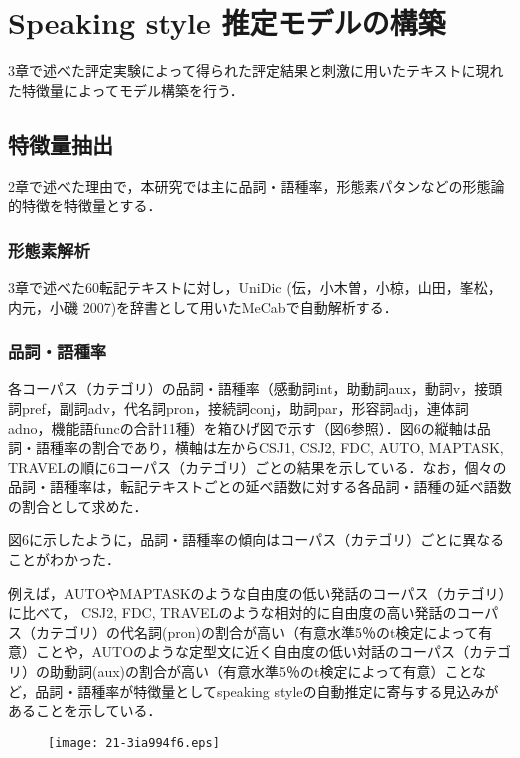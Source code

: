 \documentclass[japanese]{jnlp_1.4}
\begin{document}
\section{Speaking style 推定モデルの構築}

3章で述べた評定実験によって得られた評定結果と刺激に用いたテキストに現れた特徴量によってモデル構築を行う．

\subsection{特徴量抽出}

2章で述べた理由で，本研究では主に品詞・語種率，形態素パタンなどの形態論的特徴を特徴量とする．

\subsubsection{形態素解析}

3章で述べた60転記テキストに対し，UniDic (伝，小木曽，小椋，山田，峯松，内元，小磯 2007)を辞書として用いたMeCabで自動解析する．

\subsubsection{品詞・語種率}

各コーパス（カテゴリ）の品詞・語種率（感動詞int，助動詞aux，動詞v，接頭詞pref，副詞adv，代名詞pron，接続詞conj，助詞par，形容詞adj，連体詞adno，機能語funcの合計11種）を箱ひげ図で示す（図6参照）．図6の縦軸は品詞・語種率の割合であり，横軸は左からCSJ1, CSJ2, FDC, AUTO, MAPTASK, TRAVELの順に6コーパス（カテゴリ）ごとの結果を示している．なお，個々の品詞・語種率は，転記テキストごとの延べ語数に対する各品詞・語種の延べ語数の割合として求めた．

図6に示したように，品詞・語種率の傾向はコーパス（カテゴリ）ごとに異なることがわかった．

例えば，AUTOやMAPTASKのような自由度の低い発話のコーパス（カテゴリ）に比べて， CSJ2, FDC, TRAVELのような相対的に自由度の高い発話のコーパス（カテゴリ）の代名詞(pron)の割合が高い（有意水準5％のt検定によって有意）ことや，AUTOのような定型文に近く自由度の低い対話のコーパス（カテゴリ）の助動詞(aux)の割合が高い（有意水準5％のt検定によって有意）ことなど，品詞・語種率が特徴量としてspeaking styleの自動推定に寄与する見込みがあることを示している．

\begin{figure}[p]
\begin{center}
\texttt{[image: 21-3ia994f6.eps]}
\end{center}
\vspace{2\Cvs}
\end{figure}
\end{document}
